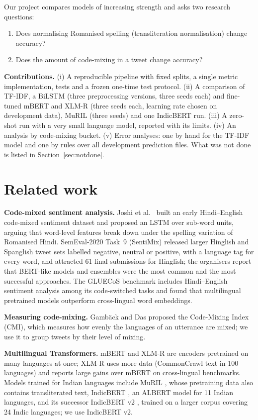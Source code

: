\documentclass{nle}
\begin{document}
Our project compares models of increasing strength and asks two research questions:
\begin{enumerate}
\item Does normalising Romanised spelling (transliteration normalisation) change accuracy?
\item Does the amount of code-mixing in a tweet change accuracy?
\end{enumerate}
\textbf{Contributions.} (i) A reproducible pipeline with fixed splits, a single metric implementation, tests and a
frozen one-time test protocol. (ii) A comparison of TF-IDF, a BiLSTM (three preprocessing versions, three seeds each) and
fine-tuned mBERT and XLM-R (three seeds each, learning rate chosen on development data), MuRIL (three seeds) and one
IndicBERT run. (iii) A zero-shot run with a very
small language model, reported with its limits. (iv) An analysis by code-mixing bucket. (v) Error analyses: one by hand
for the TF-IDF model and one by rules over all development prediction files. What was not done is listed in Section~\ref{sec:notdone}.

\section{Related work}
\textbf{Code-mixed sentiment analysis.} Joshi et al.\  built an early Hindi--English code-mixed
sentiment dataset and proposed an LSTM over sub-word units, arguing that word-level features break down under the spelling
variation of Romanised Hindi. SemEval-2020 Task~9 (SentiMix) \cite{patwa2020} released larger Hinglish and Spanglish
tweet sets labelled negative, neutral or positive, with a language tag for every word, and attracted 61 final submissions
for Hinglish; the organisers report that BERT-like models and ensembles were the most common and the most successful
approaches. The GLUECoS benchmark \cite{khanuja2020gluecos} includes Hindi--English sentiment analysis among its
code-switched tasks and found that multilingual pretrained models outperform cross-lingual word embeddings.

\textbf{Measuring code-mixing.} Gamb\"ack and Das  proposed the Code-Mixing Index (CMI), which measures
how evenly the languages of an utterance are mixed; we use it to group tweets by their level of mixing.

\textbf{Multilingual Transformers.} mBERT \cite{devlin2019} and XLM-R \cite{conneau2020} are encoders pretrained on many
languages at once; XLM-R uses more data (CommonCrawl text in 100 languages) and reports large gains over mBERT on
cross-lingual benchmarks. Models trained for Indian languages include MuRIL \cite{khanuja2021}, whose pretraining data
also contains transliterated text, IndicBERT \cite{kakwani2020}, an ALBERT model for 11 Indian languages, and its successor
IndicBERT v2 \cite{doddapaneni2023}, trained on a larger corpus covering 24 Indic languages; we use IndicBERT v2.
\end{document}
